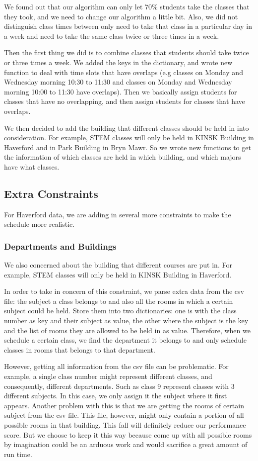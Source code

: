 \documentclass[11pt, oneside]{article}   	%
\begin{document}
We found out that our algorithm can only let 70\% students take the classes that they took, and we need to change our algorithm a little bit. Also, we did not distinguish class times between only need to take that class in a particular day in a week and need to take the same class twice or three times in a week. 

Then the first thing we did is to combine classes that students should take twice or three times a week. We added the keys in the dictionary, and wrote new function to deal with time slots that have overlaps (e.g classes on Monday and Wednesday morning 10:30 to 11:30 and classes on Monday and Wednesday morning 10:00 to 11:30 have overlaps). Then we basically assign students for classes that have no overlapping, and then assign students for classes that have overlaps. 

We then decided to add the building that different classes should be held in into consideration. For example, STEM classes will only be held in KINSK Building in Haverford and in Park Building in Bryn Mawr. So we wrote new functions to get the information of which classes are held in which building, and which majors have what classes.

\subsection{Extra Constraints}
For Haverford data, we are adding in several more constraints to make the schedule more realistic.
\subsubsection{Departments and Buildings}
We also concerned about the building that different courses are put in. For example, STEM classes will only be held in KINSK Building in Haverford. 

In order to take in concern of this constraint, we parse extra data from the csv file: the subject a class belongs to and also all the rooms in which a certain subject could be held. Store them into two dictionaries: one is with the class number as key and their subject as value, the other where the subject is the key and the list of rooms they are allowed to be held in as value. Therefore, when we schedule a certain class, we find the department it belongs to and only schedule classes in rooms that belongs to that department.

However, getting all information from the csv file can be problematic. For example, a single class number might represent different classes, and consequently, different departments. Such as class 9 represent classes with 3 different subjects. In this case, we only assign it the subject where it first appears. Another problem with this is that we are getting the rooms of certain subject from the csv file. This file, however, might only contain a portion of all possible rooms in that building. This fall will definitely reduce our performance score. But we choose to keep it this way because come up with all possible rooms by imagination could be an arduous work and would sacrifice a great amount of run time.
\end{document}
